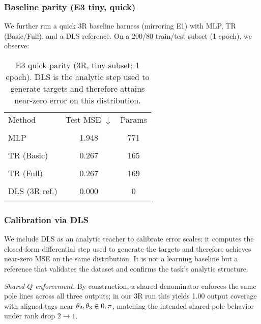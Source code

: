 \documentclass[11pt,twoside]{article}
\begin{document}
\subsubsection{Baseline parity (E3 tiny, quick)}

We further run a quick 3R baseline harness (mirroring E1) with MLP, TR (Basic/Full), and a DLS reference. On a 200/80 train/test subset (1 epoch), we observe:

\begin{table}[h]
  \centering
  \small
  \begin{tabular}{lcc}
    \toprule
    Method & Test MSE $\downarrow$ & Params \\\\
    \midrule
    MLP & 1.948 & 771 \\\\
    TR (Basic) & 0.267 & 165 \\\\
    TR (Full) & 0.267 & 169 \\\\
    DLS (3R ref.) & 0.000 & 0 \\\\
    \bottomrule
  \end{tabular}
\caption{E3 quick parity (3R, tiny subset; 1 epoch). DLS is the analytic step used to generate targets and therefore attains near-zero error on this distribution.}
\end{table}

\subsubsection{Calibration via DLS}

We include DLS as an analytic teacher to calibrate error scales: it computes the closed-form differential step used to generate the targets and therefore achieves near-zero MSE on the same distribution. It is not a learning baseline but a reference that validates the dataset and confirms the task's analytic structure.

\noindent\textit{Shared-$Q$ enforcement.} By construction, a shared denominator enforces the same pole lines across all three outputs; in our 3R run this yields 1.00 output coverage with aligned tags near $\\{\theta_2,\theta_3\\}\in\\{0,\pi\\}$, matching the intended shared-pole behavior under rank drop $2\rightarrow1$.
\end{document}
